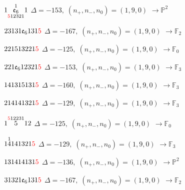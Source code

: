 \documentclass[10pt]{article}
\begin{document}
\smallskip

$1\overset{1}{\underset{\textcolor{red}{5}12321}{\mathfrak{e}_6}}1$ \quad $\Delta=-153,\; (n_+,n_-,n_0)=(1,9,0)$ \quad $\to \mathbb{P}^2$

\smallskip

$23131\mathfrak{e}_6131\textcolor{red}{5}$ \quad $\Delta=-167,\; (n_+,n_-,n_0)=(1,9,0)$ \quad $\to \mathbb{F}_{2}$

\smallskip

$221513221\textcolor{red}{5}$ \quad $\Delta=-125,\; (n_+,n_-,n_0)=(1,9,0)$ \quad $\to \mathbb{F}_{0}$

\smallskip

$221\mathfrak{e}_612321\textcolor{red}{5}$ \quad $\Delta=-153,\; (n_+,n_-,n_0)=(1,9,0)$ \quad $\to \mathbb{F}_{3}$

\smallskip

$141315131\textcolor{red}{5}$ \quad $\Delta=-160,\; (n_+,n_-,n_0)=(1,9,0)$ \quad $\to \mathbb{F}_{3}$

\smallskip

$214141321\textcolor{red}{5}$ \quad $\Delta=-129,\; (n_+,n_-,n_0)=(1,9,0)$ \quad $\to \mathbb{F}_{3}$

\smallskip

$1\overset{\textcolor{red}{5}12231}{5}12$ \quad $\Delta=-125,\; (n_+,n_-,n_0)=(1,9,0)$ \quad $\to \mathbb{F}_{0}$

\smallskip

$1\overset{1}{4}141321\textcolor{red}{5}$ \quad $\Delta=-129,\; (n_+,n_-,n_0)=(1,9,0)$ \quad $\to \mathbb{F}_{3}$

\smallskip

$131414131\textcolor{red}{5}$ \quad $\Delta=-136,\; (n_+,n_-,n_0)=(1,9,0)$ \quad $\to \mathbb{P}^2$

\smallskip

$31321\mathfrak{e}_6131\textcolor{red}{5}$ \quad $\Delta=-167,\; (n_+,n_-,n_0)=(1,9,0)$ \quad $\to \mathbb{F}_{2}$

\smallskip
\end{document}
